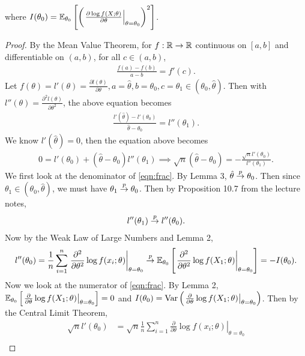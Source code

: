 where $I(\theta_0) = \mathbb{E}_{\theta_0}\left[ \left( \left.\frac{\partial \log f(X;\theta)}{\partial\theta}\right\vert_{\theta=\theta_0} \right)^2 \right]$.
\begin{proof}
By the Mean Value Theorem, for $f:\mathbb{R} \rightarrow \mathbb{R}$ continuous on $[a,b]$ and differentiable on $(a,b)$, for all $c\in(a,b)$,
\begin{align}
\frac{f(a)-f(b)}{a-b} = f'(c).
\end{align}
Let $f(\theta) = l'(\theta) = \frac{\partial l(\theta)}{\partial \theta}, a=\hat{\theta}, b=\theta_0, c=\theta_1 \in (\theta_0, \hat{\theta})$. Then with $l''(\theta) = \frac{\partial^2 l(\theta)}{\partial \theta^2}$, the above equation becomes
\begin{align}
\frac{l'(\hat{\theta}) - l'(\theta_0)}{\hat{\theta} - \theta_0} = l''(\theta_1).
\end{align}
We know $l'(\hat{\theta}) = 0$, then the equation above becomes
\begin{align}
0 = l'(\theta_0) + (\hat{\theta} - \theta_0)l''(\theta_1) \implies \sqrt{n}(\hat{\theta} - \theta_0) = -\frac{\sqrt{n}l'(\theta_0)}{l''(\theta_1)}. \label{eqn:frac}
\end{align}
We first look at the denominator of \cref{eqn:frac}. By Lemma 3, $\hat{\theta} \overset{p}{\rightarrow} \theta_0$. Then since $\theta_1\in(\theta_0, \hat{\theta})$, we must have $\theta_1 \overset{p}{\rightarrow} \theta_0$. Then by Proposition 10.7 from the lecture notes, 
\begin{align}
l''(\theta_1) \overset{p}{\rightarrow} l''(\theta_0).
\end{align}
Now by the Weak Law of Large Numbers and Lemma 2,
\begin{align}
l''(\theta_0) = \frac{1}{n}\sum_{i=1}^n \left.\frac{\partial^2}{\partial \theta^2}\log f(x_i; \theta)\right\vert_{\theta=\theta_0} \overset{p}{\rightarrow} \mathbb{E}_{\theta_0}\left[ \left.\frac{\partial^2}{\partial \theta^2}\log f(X_1; \theta)\right\vert_{\theta=\theta_0} \right] = -I(\theta_0). \label{eqn:denom}
\end{align}
Now we look at the numerator of \cref{eqn:frac}. By Lemma 2, $\mathbb{E}_{\theta_0}\left[ \left.\frac{\partial}{\partial\theta}\log f(X_1;\theta)\right\vert_{\theta=\theta_0} \right] = 0$ and $I(\theta_0) = \text{Var}\left( \left.\frac{\partial}{\partial\theta}\log f(X_1;\theta)\right\vert_{\theta=\theta_0} \right)$. Then by the Central Limit Theorem,
\begin{align}
\sqrt{n}l'(\theta_0) &= \sqrt{n}\frac{1}{n}\sum_{i=1}^n \left.\frac{\partial}{\partial\theta}\log f(x_i;\theta)\right\vert_{\theta=\theta_0}\\

\end{align}
\end{proof}

